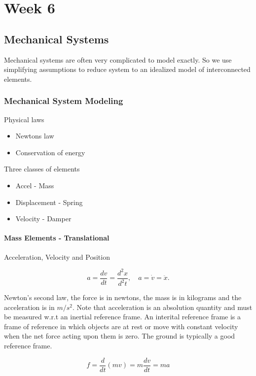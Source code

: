 \documentclass[12pt, a4paper]{report}
\begin{document}
  \part{Week 6}

  \chapter{Mechanical Systems}

  Mechanical systems are often very complicated to model exactly. So we use simplifying assumptions to reduce system to an idealized model of interconnected elements.

  \section{Mechanical System Modeling}

  Physical laws
  \begin{itemize}
    \item Newtons law
    \item Conservation of energy
  \end{itemize}

  Three classes of elements
  \begin{itemize}
    \item Accel - Mass
    \item Displacement - Spring
    \item Velocity - Damper
  \end{itemize}

  \subsection{Mass Elements - Translational}

  Acceleration, Velocity and Position

  \[
      a = \frac{dv}{dt} = \frac{d^2x}{d^2t}, \quad a = \dot v = \ddot x
    .\]

  Newton's second law, the force is in newtons, the mass is in kilograms and the acceleration is in $ m/s^2. $ Note that acceleration is an absolution quantity and must be measured w.r.t an inertial reference frame. An interital reference frame is a frame of reference in which objects are at rest or move with constant velocity when the net force acting upon them is zero. The ground is typically a good reference frame.

  \begin{equation}
    f = \frac{d}{dt}(mv) = m \frac{dv}{dt} = ma
  \end{equation}
\end{document}
